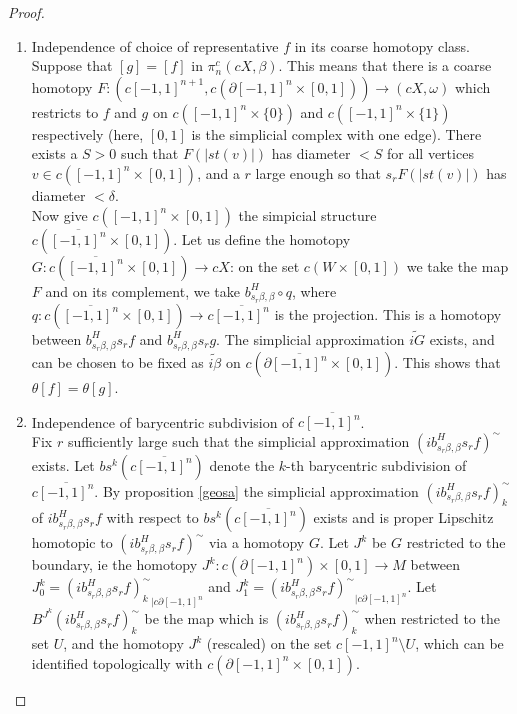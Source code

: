 \documentclass[a4paper,11pt]{article}
\theoremstyle{definition}
\theoremstyle{plain}
\theoremstyle{remark}
\begin{document}
{\begin{proof}
\begin{enumerate}
\item Independence of choice of representative $f$ in its coarse homotopy class.\\

Suppose that $[g]=[f]$ in $\pi_n^c(cX,\beta)$. This means that there is a coarse homotopy $F: (c[-1,1]^{n+1}, c(\partial [-1,1]^{n}\times [0,1]))\rightarrow (cX,\omega)$ which restricts to $f$ and $g$ on $c([-1,1]^n \times \{0\})$ and $c([-1,1]^n \times \{1\})$ respectively (here, $[0,1]$ is the simplicial complex with one edge). There exists a $S>0$ such that $F(|st(v)|)$ has diameter $<S$ for all vertices $v\in c([-1,1]^{n} \times [0,1])$, and a $r$ large enough so that $s_{r} F(|st(v)|)$ has diameter $<\delta$.\\

 Now give $c([-1,1]^n \times [0,1])$ the simpicial structure $c(\overline{[-1,1]^n} \times [0,1])$. Let us define the homotopy $G: c(\overline{[-1,1]^n} \times [0,1]) \rightarrow cX$: on the set $c(W\times [0,1])$ we take the map $F$ and on its complement, we take $b^H_{s_{r}\beta,\beta} \circ q$, where $q: c(\overline{[-1,1]^n} \times [0,1])\rightarrow c\overline{[-1,1]^n}$ is the projection. This is a homotopy between $b^H_{s_{r}\beta,\beta}s_{r}f$ and $b^H_{s_{r}\beta,\beta} s_{r}g$. The simplicial approximation $\widetilde{iG}$ exists, and can be chosen to be fixed as $\widetilde{i\beta}$ on $c(\partial \overline{[-1,1]^n} \times [0,1])$. This shows that $\theta[f] = \theta[g]$. 

\item Independence of barycentric subdivision of $c\overline{[-1,1]^n}$. \\

Fix $r$ sufficiently large such that the simplicial approximation $(ib^H_{s_{r}\beta,\beta}s_{r}f)^{\sim}$ exists. Let $bs^k(c\overline{[-1,1]^n})$ denote the $k$-th barycentric subdivision of $c\overline{[-1,1]^n}$. By proposition \ref{geosa} the simplicial approximation $(ib^H_{s_{r}\beta,\beta}s_{r}f)^{\sim}_{k}$ of $ib^H_{s_{r}\beta,\beta}s_{r}f$ with respect to $bs^k(c\overline{[-1,1]^n})$ exists and is proper Lipschitz homotopic to $(ib^H_{s_{r}\beta,\beta}s_{r}f)^{\sim}$ via a homotopy $G$. Let $J^{k}$ be $G$ restricted to the boundary, ie the homotopy $J^{k}: c(\partial[-1,1]^n) \times [0,1]\rightarrow M$ between $J^{k}_{0}= {(ib^H_{s_{r}\beta,\beta}s_{r}f)^{\sim}_{k}}_{|c\partial[-1,1]^n}$ and  $J^{k}_{1}= {(ib^H_{s_{r}\beta,\beta}s_{r}f)^{\sim}}_{|c\partial[-1,1]^n}$. Let $B^{J^{k}}(ib^H_{s_{r}\beta,\beta}s_{r}f)^{\sim}_{k}$ be the map which is $(ib^H_{s_{r}\beta,\beta}s_{r}f)^{\sim}_{k}$  when restricted to the set $U$, and the homotopy $J^{k}$ (rescaled) on the set $c[-1,1]^n \setminus U$, which can be identified topologically with $c(\partial[-1,1]^n \times [0,1])$. 


\end{enumerate}
\end{proof}}
\end{document}
